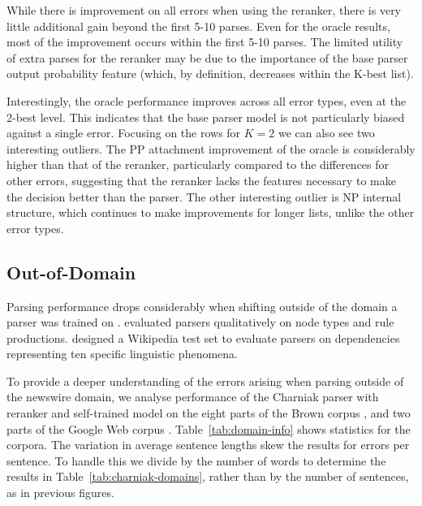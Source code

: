While there is improvement on all errors when using the reranker, there is very
little additional gain beyond the first 5-10 parses.  Even for the oracle
results, most of the improvement occurs within the first 5-10 parses.  The
limited utility of extra parses for the reranker may be due to the importance
of the base parser output probability feature (which, by definition, decreases
within the K-best list).

Interestingly, the oracle performance improves across all error types, even at
the 2-best level.  This indicates that the base parser model is not
particularly biased against a single error.  Focusing on the rows for $K=2$ we
can also see two interesting outliers.  The PP attachment improvement of the
oracle is considerably higher than that of the reranker, particularly compared
to the differences for other errors, suggesting that the reranker lacks the
features necessary to make the decision better than the parser.  The other
interesting outlier is NP internal structure, which continues to make
improvements for longer lists, unlike the other error types.

\subsection{Out-of-Domain}

Parsing performance drops considerably when shifting outside of the domain a
parser was trained on \parencite{Gildea:2001}.
\textcite{Clegg:2005:EIT:1626315.1626317} evaluated parsers qualitatively on
node types and rule productions.  \textcite{Bender:2011:PEO:2145432.2145479}
designed a Wikipedia test set to evaluate parsers on dependencies representing
ten specific linguistic phenomena.

\begin{landscape}

\end{landscape}

To provide a deeper understanding of the errors arising when parsing outside of
the newswire domain, we analyse performance of the Charniak parser with
reranker and self-trained model on the eight parts of the Brown corpus
\parencite{Marcus-Marcinkiewicz-Santorini:1993}, and two parts of the Google Web
corpus \parencite{Petrov:2012}.  Table~\ref{tab:domain-info} shows statistics for
the corpora.  The variation in average sentence lengths skew the results for
errors per sentence.  To handle this we divide by the number of words to
determine the results in Table~\ref{tab:charniak-domains}, rather than by the
number of sentences, as in previous figures.

